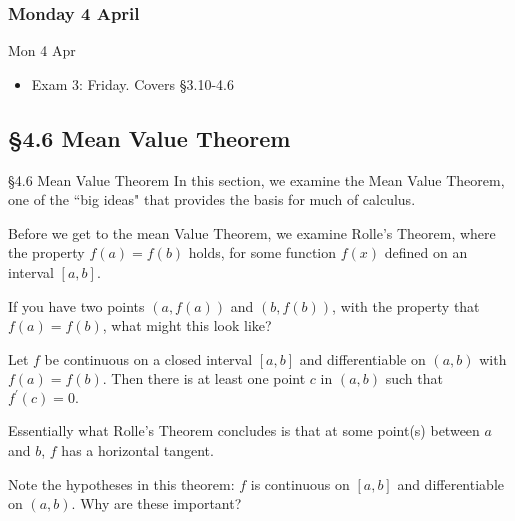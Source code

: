 \documentclass[cal1spr16Lectures.tex]{subfiles}
\begin{document}

\subsubsection{\bf Monday 4 April}

\begin{frame}[allowframebreaks]{Mon 4 Apr}
\begin{itemize}%
\item Exam 3: Friday.  Covers \S 3.10-4.6 
\end{itemize}
\end{frame}

\subsection[4.6 Mean Value Theorem]{\S 4.6 Mean Value Theorem}

\begin{frame}{\S 4.6 Mean Value Theorem}\small
In this section, we examine the Mean Value Theorem, one of the ``big ideas" that provides the basis for much of calculus.  

\vspace{0.5pc}
Before we get to the mean Value Theorem, we examine Rolle's Theorem, where the property $f(a)=f(b)$ holds, for some function $f(x)$ defined on an interval $[a,b]$.

\begin{que}
If you have two points $(a,f(a))$ and $(b,f(b))$, with the property that $f(a)=f(b)$, what might this look like?
\end{que}
\end{frame}

\begin{frame}\small 
\begin{thm}  
Let $f$ be continuous on a closed interval $[a,b]$ and differentiable on $(a,b)$ with $f(a)=f(b)$.  Then there is at least one point $c$ in $(a,b)$ such that $f^{\prime}(c)=0.$ 
\end{thm}
Essentially what Rolle's Theorem concludes is that at some point(s) between $a$ and $b$, $f$ has a horizontal tangent.
\begin{que}
Note the hypotheses in this theorem: $f$ is continuous on $[a,b]$ and differentiable on $(a,b)$.  Why are these important?
\end{que}
\end{frame}
\end{document}

